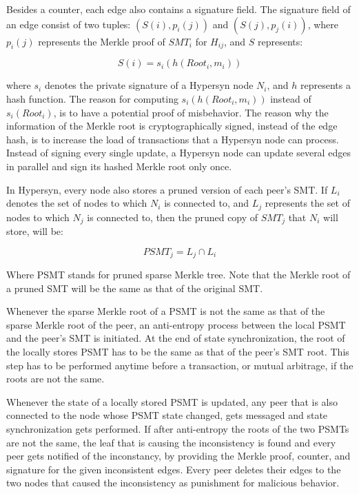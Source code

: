 \documentclass{article}
\begin{document}
Besides a counter, each edge also contains a signature field. The signature field of an edge consist of two tuples: $(S(i), p_i(j))$ and $(S(j), p_j(i))$, where $p_i(j)$ represents the Merkle proof of $SMT_i$ for $H_{ij}$, and $S$ represents:

\begin{equation}
\label{eq:edge_signature}
       S(i) = s_i(h(Root_i, m_i)) 
\end{equation}

where $s_i$ denotes the private signature of a Hypersyn node $N_i$, and $h$ represents a hash function. The reason for computing $s_i(h(Root_i, m_i))$ instead of $s_i(Root_i)$, is to have a potential proof of misbehavior. The reason why the information of the Merkle root is cryptographically signed, instead of the edge hash, is to increase the load of transactions that a Hypersyn node can process. Instead of signing every single update, a Hypersyn node can update several edges in parallel and sign its hashed Merkle root only once.

In Hypersyn, every node also stores a pruned version of each peer's SMT. If $L_i$ denotes the set of nodes to which $N_i$ is connected to, and $L_j$ represents the set of nodes to which $N_j$ is connected to, then the pruned copy of $SMT_j$ that $N_i$ will store, will be:

\begin{equation}
\label{eq:edge_signature}
       PSMT_j = L_j \cap L_i
\end{equation}

Where PSMT stands for pruned sparse Merkle tree. Note that the Merkle root of a pruned SMT will be the same as that of the original SMT. 

Whenever the sparse Merkle root of a PSMT is not the same as that of the sparse Merkle root of the peer, an anti-entropy process \cite{decandia_dynamo_2016} between the local PSMT and the peer's SMT is initiated. At the end of state synchronization, the root of the locally stores PSMT has to be the same as that of the peer's SMT root. This step has to be performed anytime before a transaction, or mutual arbitrage, if the roots are not the same.

Whenever the state of a locally stored PSMT is updated, any peer that is also connected to the node whose PSMT state changed, gets messaged and state synchronization gets performed. If after anti-entropy the roots of the two PSMTs are not the same, the leaf that is causing the inconsistency is found and every peer gets notified of the inconstancy, by providing the Merkle proof, counter, and signature for the given inconsistent edges. Every peer deletes their edges to the two nodes that caused the inconsistency as punishment for malicious behavior.
\end{document}

